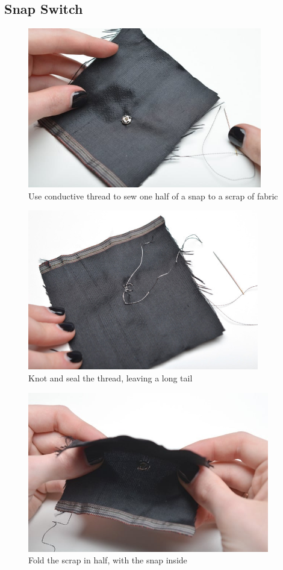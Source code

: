 \documentclass[letterpaper,twoside,12pt]{article}
\begin{document}
\subsection{Snap Switch}
\begin{figure}[hbpt]\begin{centering}%
\includegraphics[height=2.75in]{flora-angler-embroidery-17.jpg}
\caption{Use conductive thread to sew one half of a snap to a scrap of fabric}
\label{fig:flora-angler-embroidery-17}
\end{centering}\end{figure}
\begin{figure}[hbpt]\begin{centering}%
\includegraphics[height=2.75in]{flora-angler-embroidery-18.jpg}
\caption{Knot and seal the thread, leaving a long tail}
\label{fig:flora-angler-embroidery-18}
\end{centering}\end{figure}
\begin{figure}[hbpt]\begin{centering}%
\includegraphics[height=2.75in]{flora-angler-embroidery-19.jpg}
\caption{Fold the scrap in half, with the snap inside}
\label{fig:flora-angler-embroidery-19}
\end{centering}\end{figure}
\end{document}
